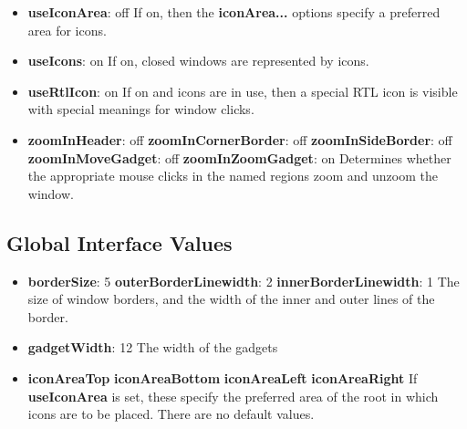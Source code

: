 \begin{itemize}
\item {\bf useIconArea}: off\newline{}
If on, then the {\bf iconArea...} options specify a preferred area
for icons.

\item {\bf useIcons}: on\newline{}
If on, closed windows are represented by icons.

\item {\bf useRtlIcon}: on\newline{}
If on and icons are in use, then a special RTL icon is visible
with special meanings for window clicks.

\item {\bf zoomInHeader}: off\newline{}
{\bf zoomInCornerBorder}: off\newline{}
{\bf zoomInSideBorder}: off\newline{}
{\bf zoomInMoveGadget}: off\newline{}
{\bf zoomInZoomGadget}: on\newline{}
Determines whether the appropriate mouse clicks in the named
regions zoom and unzoom the window.
\end{itemize}

\subsection{Global Interface Values}

\begin{itemize}
\item {\bf borderSize}: 5\newline{}
{\bf outerBorderLinewidth}: 2\newline{}
{\bf innerBorderLinewidth}: 1\newline{}
The size of window borders, and the width of the inner and outer
lines of the border.

\item {\bf gadgetWidth}: 12\newline{}
The width of the gadgets

\item {\bf iconAreaTop}\newline{}
{\bf iconAreaBottom}\newline{}
{\bf iconAreaLeft}\newline{}
{\bf iconAreaRight}\newline{}
If {\bf useIconArea} is set, these specify the preferred area of the
root in which icons are to be placed.  There are no default values.

\end{itemize}

